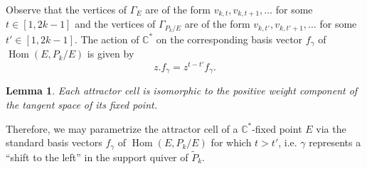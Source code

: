 \documentclass{amsart}
\newtheorem{lemma}[theorem]{Lemma}
\numberwithin{equation}{section}
\newcommand{\CC}{\mathbb{C}}
\newcommand{\Hom}{\operatorname{Hom}}
\begin{document}
  Observe that the vertices of $\Gamma_E$ are of the form $v_{k,t},v_{k,t+1},\ldots$ for some $t\in[1,2k-1]$ and the vertices of $\Gamma_{P_k/E}$ are of the form $v_{k,t'},v_{k,t'+1},\ldots$ for some $t'\in[1,2k-1]$.
  The action of $\CC^*$ on the corresponding basis vector $f_\gamma$ of $\Hom(E,P_k/E)$ is given by
  \[z.f_\gamma=z^{t-t'}f_\gamma.\]

  \begin{lemma}
    Each attractor cell is isomorphic to the positive weight component of the tangent space of its fixed point.
  \end{lemma}

  Therefore, we may parametrize the attractor cell of a $\CC^*$-fixed point $E$ via the standard basis vectors $f_\gamma$ of $\Hom(E,P_k/E)$ for which $t>t'$, i.e. $\gamma$ represents a ``shift to the left'' in the support quiver of $\tilde P_k$.
\end{document}
